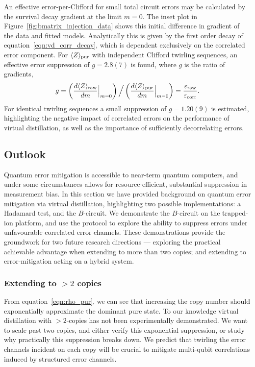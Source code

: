 An effective error-per-Clifford for small total circuit errors may be calculated by the survival decay gradient at the limit $m=0$. The inset plot in Figure~\ref{fig:bmatrix_injection_data} shows this initial difference in gradient of the data and fitted models. Analytically this is given by the first order decay of equation~\ref{eqn:vd_corr_decay}, which is dependent exclusively on the correlated error component. For $\langle Z\rangle_{\rm pur}$ with independent Clifford twirling sequences, an effective error suppression of $g=2.8(7)$ is found, where $g$ is the ratio of gradients,
\begin{equation}
g=\left(\frac{d\langle Z \rangle_{\rm raw}}{dm}\Big|_{m=0}\right)\Big/\left(\frac{d\langle Z \rangle_{\rm pur}}{dm}\Big|_{m=0}\right)= \frac{\varepsilon_{\rm raw}}{\varepsilon_{\rm corr}}.
\end{equation}
For identical twirling sequences a small suppression of $g=1.20(9)$ is estimated, highlighting the negative impact of correlated errors on the
performance of virtual distillation, as well as the importance of sufficiently
decorrelating errors.


\subsection{Outlook}

Quantum error mitigation is accessible to near-term quantum computers, and under some circumstances allows for resource-efficient, substantial suppression in measurement bias. In this section we have provided background on quantum error mitigation via virtual distillation, highlighting two possible implementations: a Hadamard test, and the $B$-circuit. We demonstrate the $B$-circuit on the trapped-ion platform, and use the protocol to explore the ability to suppress errors under unfavourable correlated error channels. These demonstrations provide the groundwork for two future research directions --- exploring the practical achievable advantage when extending to more than two copies; and extending to error-mitigation acting on a hybrid system.

\subsubsection{Extending to $>2$ copies}

    From equation~\ref{eqn:rho_pur}, we can see that increasing the copy number
    should exponentially approximate the dominant pure state. To our knowledge virtual distillation with $>2$-copies has not been experimentally demonstrated. We want to scale past two copies, and either verify this exponential suppression, or study why practically this suppression breaks down. We predict that twirling the error channels incident on each copy will be crucial to mitigate multi-qubit correlations induced by structured error channels.

